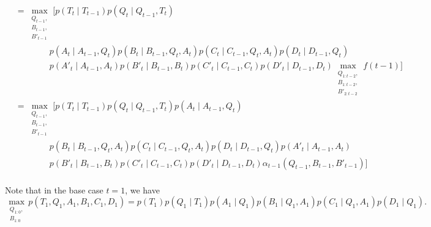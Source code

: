\documentclass[11pt]{article}
\newcommand{\eat}[1]{}
\begin{document}
\begin{small}
\begin{tiny}
\begin{align*}
&= \max\limits_{\substack{Q_{t-1},\\ B_{t-1},\\B'_{t-1}}} 
\Bigg[
p(T_t \mid T_{t-1})
p(Q_t \mid Q_{t-1}, T_t)\\&\qquad\qquad
p(A_t \mid A_{t-1}, Q_t)
p(B_t \mid B_{t-1}, Q_t, A_t)
p(C_t \mid C_{t-1}, Q_t, A_t)
p(D_t \mid D_{t-1}, Q_t)\\&\qquad\qquad
p(A'_t \mid A_{t-1}, A_t)
p(B'_t \mid B_{t-1}, B_t)
p(C'_t \mid C_{t-1}, C_t)
p(D'_t \mid D_{t-1}, D_t)
\max\limits_{\substack{Q_{1:t-2},\\ B_{1:t-2},\\B'_{2:t-2}}}
f(t-1)\Bigg]\\
&= \max\limits_{\substack{Q_{t-1},\\ B_{t-1},\\B'_{t-1}}} 
\Bigg[
p(T_t \mid T_{t-1})
p(Q_t \mid Q_{t-1}, T_t)
p(A_t \mid A_{t-1}, Q_t)\\&\qquad\qquad
p(B_t \mid B_{t-1}, Q_t, A_t)
p(C_t \mid C_{t-1}, Q_t, A_t)
p(D_t \mid D_{t-1}, Q_t)
p(A'_t \mid A_{t-1}, A_t)\\&\qquad\qquad
p(B'_t \mid B_{t-1}, B_t)
p(C'_t \mid C_{t-1}, C_t)
p(D'_t \mid D_{t-1}, D_t)
\alpha_{t-1}(Q_{t-1}, B_{t-1}, B'_{t-1})\Bigg]\\
\end{align*}
\end{tiny}

Note that in the base case $t=1$, we have
    \[
    \max\limits_{\substack{Q_{1:0},\\ B_{1:0}}} p(T_1,Q_1, A_1, B_1, C_1, D_1) = p(T_1) p(Q_1 \mid T_1) p(A_1 \mid Q_1) p(B_1 \mid Q_1, A_1) p(C_1 \mid Q_1, A_1) p(D_1 \mid Q_1).
    \]




\eat{
\resizebox{0.5\textwidth}{!}{\begin{tikzpicture}[baseline=-0.5ex]
    \draw (0,0) -- (1,0) -- (2,1) -- (3,0) -- (4,0);
    \draw (1,0) -- (2,-1) -- (3,0);
    \draw[bend left = 50] (0,0) to (3,0);
    \node[star] at (0,0) {$w_1$};
    \node[star] at (1,0) {$w_2$};
    \node[star] at (2,1) {$w_3$};
    \node[star] at (2,-1) {$w_4$};
    \node[star] at (3,0) {$w_5$};
    \node[star] at (4,0) {$w_6$};
\end{tikzpicture}}

}
\end{small}
\end{document}
